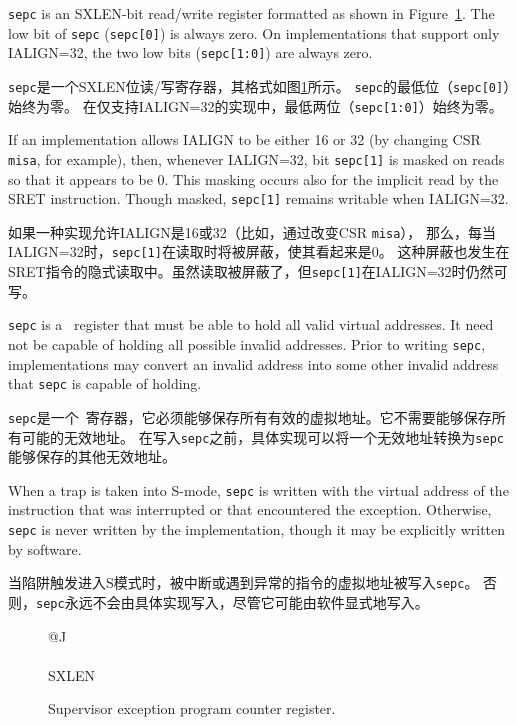 {\tt sepc} is an SXLEN-bit read/write register formatted as shown in
Figure~\ref{epcreg}.  The low bit of {\tt sepc} ({\tt sepc[0]}) is
always zero.  On implementations that support only IALIGN=32, the two low bits
({\tt sepc[1:0]}) are always zero.

{\tt sepc}是一个SXLEN位读/写寄存器，其格式如图\ref{epcreg}所示。
{\tt sepc}的最低位（{\tt sepc[0]}）始终为零。
在仅支持IALIGN=32的实现中，最低两位（{\tt sepc[1:0]}）始终为零。

If an implementation allows IALIGN to be either 16 or 32 (by
changing CSR {\tt misa}, for example), then, whenever IALIGN=32, bit
{\tt sepc[1]} is masked on reads so that it appears to be 0.  This
masking occurs also for the implicit read by the SRET instruction.
Though masked, {\tt sepc[1]} remains writable when IALIGN=32.

如果一种实现允许IALIGN是16或32（比如，通过改变CSR {\tt misa}），
那么，每当IALIGN=32时，{\tt sepc[1]}在读取时将被屏蔽，使其看起来是0。
这种屏蔽也发生在SRET指令的隐式读取中。虽然读取被屏蔽了，但{\tt sepc[1]}在IALIGN=32时仍然可写。

{\tt sepc} is a \warl\ register that must be able to hold all valid
virtual addresses.  It need not be capable of holding all possible invalid
addresses.
Prior to writing {\tt sepc}, implementations may convert an invalid address
into some other invalid address that {\tt sepc} is capable of holding.

{\tt sepc}是一个\warl\ 寄存器，它必须能够保存所有有效的虚拟地址。它不需要能够保存所有可能的无效地址。
在写入{\tt sepc}之前，具体实现可以将一个无效地址转换为{\tt sepc}能够保存的其他无效地址。

When a trap is taken into S-mode, {\tt sepc} is written with the
virtual address of the instruction that was interrupted or that
encountered the exception.  Otherwise, {\tt sepc} is never written by
the implementation, though it may be explicitly written by software.

当陷阱触发进入S模式时，被中断或遇到异常的指令的虚拟地址被写入{\tt sepc}。
否则，{\tt sepc}永远不会由具体实现写入，尽管它可能由软件显式地写入。

\begin{figure}[h!]
{\footnotesize
\begin{center}
\begin{tabular}{@{}J}
 \\
\hline
{} \\
\hline
SXLEN \\
\end{tabular}
\end{center}
}
\vspace{-0.1in}
\caption{Supervisor exception program counter register.}
\label{epcreg}
\end{figure}

